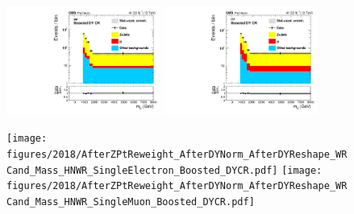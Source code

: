 \begin{figure}[htbp]
  \includegraphics[width=0.45\textwidth]{figures/2017/AfterZPtReweight_AfterDYNorm_AfterDYReshape_WRCand_Mass_HNWR_SingleElectron_Boosted_DYCR.pdf}
  \hspace{0.01\textwidth}
  \includegraphics[width=0.45\textwidth]{figures/2017/AfterZPtReweight_AfterDYNorm_AfterDYReshape_WRCand_Mass_HNWR_SingleMuon_Boosted_DYCR.pdf}
  \vspace{0.01\textwidth}

  \texttt{[image: figures/2018/AfterZPtReweight\_AfterDYNorm\_AfterDYReshape\_WRCand\_Mass\_HNWR\_SingleElectron\_Boosted\_DYCR.pdf]}
  \hspace{0.01\textwidth}
  \texttt{[image: figures/2018/AfterZPtReweight\_AfterDYNorm\_AfterDYReshape\_WRCand\_Mass\_HNWR\_SingleMuon\_Boosted\_DYCR.pdf]}


  \label{fig:AfterZPtReweight_AfterDYNorm_AfterDYReshape_WRCand_Mass_Boosted_DYCR}
\end{figure}




